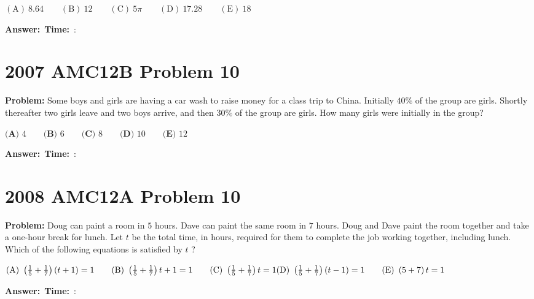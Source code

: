 \documentclass[12pt]{article}
\begin{document}
$\mathrm{(A)}\ 8.64\qquad \mathrm{(B)}\ 12\qquad \mathrm{(C)}\ 5\pi\qquad \mathrm{(D)}\ 17.28\qquad \mathrm{(E)}\ 18$

\vspace{0.3cm}
\noindent\textbf{Answer:}~\underline{\hspace{5cm}}\hfill\textbf{Time:}~\underline{\hspace{1.2cm}}:\underline{\hspace{1.2cm}}

\vspace{0.5cm}

\section{2007 AMC12B Problem 10}

\textbf{Problem:}
Some boys and girls are having a car wash to raise money for a class trip to China. Initially $40\%$ of the group are girls. Shortly thereafter two girls leave and two boys arrive, and then $30\%$ of the group are girls. How many girls were initially in the group?

$\textbf{(A) } 4 \qquad\textbf{(B) } 6 \qquad\textbf{(C) } 8 \qquad\textbf{(D) } 10 \qquad\textbf{(E) } 12$

\vspace{0.3cm}
\noindent\textbf{Answer:}~\underline{\hspace{5cm}}\hfill\textbf{Time:}~\underline{\hspace{1.2cm}}:\underline{\hspace{1.2cm}}

\vspace{0.5cm}

\section{2008 AMC12A Problem 10}

\textbf{Problem:}
Doug can paint a room in $5$ hours. Dave can paint the same room in $7$ hours. Doug and Dave paint the room together and take a one-hour break for lunch. Let $t$ be the total time, in hours, required for them to complete the job working together, including lunch. Which of the following equations is satisfied by $t$ ?

$\mathrm{(A)}\ \left(\frac{1}{5}+\frac{1}{7}\right)\left(t+1\right)=1\qquad\mathrm{(B)}\ \left(\frac{1}{5}+\frac{1}{7}\right)t+1=1\qquad\mathrm{(C)}\ \left(\frac{1}{5}+\frac{1}{7}\right)t=1\\\mathrm{(D)}\ \left(\frac{1}{5}+\frac{1}{7}\right)\left(t-1\right)=1\qquad\mathrm{(E)}\ \left(5+7\right)t=1$

\vspace{0.3cm}
\noindent\textbf{Answer:}~\underline{\hspace{5cm}}\hfill\textbf{Time:}~\underline{\hspace{1.2cm}}:\underline{\hspace{1.2cm}}

\vspace{0.5cm}
\end{document}
